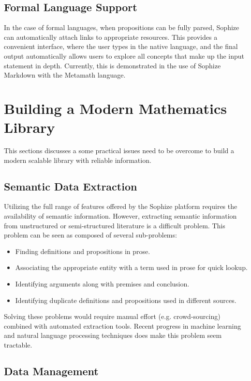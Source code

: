 \documentclass[runningheads]{llncs}
\begin{document}
\subsection{Formal Language Support}
In the case of formal languages, when propositions can be fully parsed, Sophize can automatically attach links to appropriate resources. This provides a convenient interface, where the user types in the native language, and the final output automatically allows users to explore all concepts that make up the input statement in depth. Currently, this is demonstrated in the use of Sophize Markdown with the Metamath language.

\section{Building a Modern Mathematics Library}
\label{sec:lib}
This sections discusses a some practical issues need to be overcome to build a modern scalable library with reliable information.

\subsection{Semantic Data Extraction}
Utilizing the full range of features offered by the Sophize platform requires the availability of semantic information. However, extracting semantic information from unstructured or semi-structured literature is a difficult problem. This problem can be seen as composed of several sub-problems:
\begin{itemize}
\item Finding definitions and propositions in prose.
\item Associating the appropriate entity with a term used in prose for quick lookup.
\item Identifying arguments along with premises and conclusion.
\item \label{prob:dup} Identifying duplicate definitions and propositions used in different sources.
\end{itemize}

Solving these problems would require manual effort (e.g. crowd-sourcing) combined with automated extraction tools. Recent progress in machine learning and natural language processing techniques \cite{ginev2019scientific} does make this problem seem tractable.

\subsection{Data Management}
\end{document}
